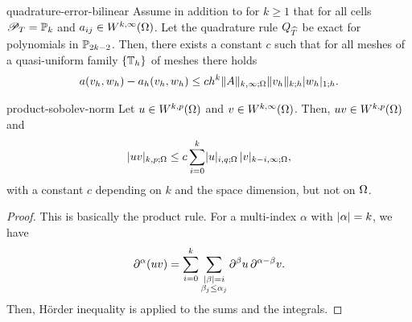 \begin{Theorem}{quadrature-error-bilinear}
  Assume in addition to
   for $k\ge1$ that
  for all cells $\shapespace_\cell = \P_k$ and $a_{ij}\in
  W^{k,\infty}(\domain)$.
  Let the quadrature rule $Q_{\refcell}$ be exact for polynomials in
  $\P_{2k-2}$.  Then, there exists a constant $c$ such that for all
  meshes of a quasi-uniform family $\{\mesh_h\}$ of meshes there holds
  \begin{gather}
    a(v_h, w_h) - a_h(v_h, w_h) \le c h^k \norm{A}_{k,\infty;\domain}
    \norm{v_h}_{k;h} \snorm{w_h}_{1;h}.
  \end{gather}
\end{Theorem}

\begin{Lemma}{product-sobolev-norm}
  Let $u\in W^{k,p}(\domain)$ and $v\in W^{k,\infty}(\domain)$. Then,
  $uv\in W^{k,p}(\domain)$ and
  \begin{gather}
    \snorm{uv}_{k,p;\domain}
    \le c \sum_{i=0}^{k} \snorm{u}_{i,q;\domain}\,
    \snorm{v}_{k-i,\infty;\domain},
  \end{gather}
  with a constant $c$ depending on $k$ and the space dimension, but
  not on $\domain$.
\end{Lemma}

\begin{proof}
  This is basically the product rule. For a multi-index $\alpha$ with
  $\abs{\alpha} = k$, we have
  \begin{gather*}
    \d^{\alpha}(uv) = \sum_{i=0}^k
    \sum_{\substack{\abs{\beta}=i\\\beta_j\le \alpha_j}} \d^{\beta}u\,\d^{\alpha-\beta} v.
  \end{gather*}
  Then, Hörder inequality is applied to the sums and the integrals.
\end{proof}

